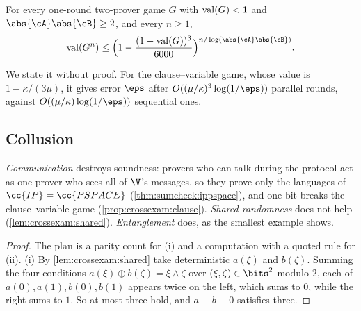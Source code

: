 \begin{refsection}
\begin{theorem}\label{thm:crossexam:raz}
For every one-round two-prover game $G$ with $\mathrm{val}(G)<1$ and $\abs{\cA}\abs{\cB}\ge2$, and every $n\ge1$,
\[
  \crossexamval(G^n)\le\Bigl(1-\frac{(1-\crossexamval(G))^3}{6000}\Bigr)^{n/\log(\abs{\cA}\abs{\cB})}.
\]
\end{theorem}

We state it without proof. For the clause--variable game, whose value is $1-\kappa/(3\mu)$, it gives error $\eps$ after $O((\mu/\kappa)^3\log(1/\eps))$ parallel rounds, against $O((\mu/\kappa)\log(1/\eps))$ sequential ones.

\subsection{Collusion}\label{sec:crossexam:collusion}

\emph{Communication} destroys soundness: provers who can talk during the protocol act as one prover who sees all of $\V$'s messages, so they prove only the languages of $\cc{IP}=\cc{PSPACE}$ (\cref{thm:sumcheck:ippspace}), and one bit breaks the clause--variable game (\cref{prop:crossexam:clause}). \emph{Shared randomness} does not help (\cref{lem:crossexam:shared}). \emph{Entanglement} does, as the smallest example shows.


\begin{proof}
The plan is a parity count for (i) and a computation with a quoted rule for (ii). (i) By \cref{lem:crossexam:shared} take deterministic $a(\xi)$ and $b(\zeta)$. Summing the four conditions $a(\xi)\oplus b(\zeta)=\xi\wedge\zeta$ over $(\xi,\zeta)\in\bits^2$ modulo $2$, each of $a(0),a(1),b(0),b(1)$ appears twice on the left, which sums to $0$, while the right sums to $1$. So at most three hold, and $a\equiv b\equiv0$ satisfies three.


\end{proof}
\end{refsection}
